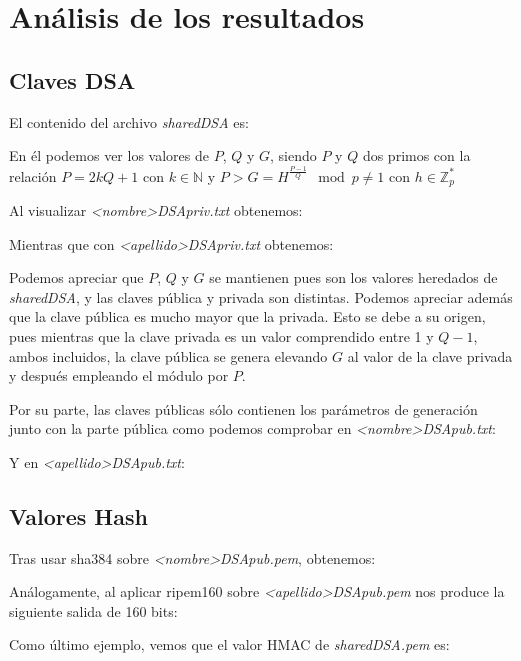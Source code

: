 \documentclass[a4paper, 11pt]{article}
\begin{document}
\section{Análisis de los resultados}
	\subsection{Claves DSA}
		El contenido del archivo \textit{sharedDSA} es:
		

		En él podemos ver los valores de $P$, $Q$ y $G$, siendo $P$ y $Q$ dos primos con la relación $P = 2kQ+1$ con $k \in
		\mathbb{N}$ y $P > G = H^{\frac{P-1}{Q}} \mod{p} \neq 1$ con $h \in \mathbb{Z}^*_p$
		
		Al visualizar \textit{<nombre>DSApriv.txt} obtenemos:
		
		
		Mientras que con \textit{<apellido>DSApriv.txt} obtenemos:
		
		
		Podemos apreciar que $P$, $Q$ y $G$ se mantienen pues son los valores heredados de \textit{sharedDSA}, y las claves
		pública y privada son distintas. Podemos apreciar además que la clave pública es mucho mayor que la privada. Esto se
		debe a su origen, pues mientras que la clave privada es un valor comprendido entre 1 y $Q-1$, ambos incluidos, la
		clave pública se genera elevando $G$ al valor de la clave privada y después empleando el módulo por $P$.

		Por su parte, las claves públicas sólo contienen los parámetros de generación junto con la parte pública como podemos
		comprobar en \textit{<nombre>DSApub.txt}:
		
		
		Y en \textit{<apellido>DSApub.txt}:
		
		
	\subsection{Valores Hash}
		Tras usar sha384 sobre \textit{<nombre>DSApub.pem}, obtenemos:
		
		
		Análogamente, al aplicar ripem160 sobre \textit{<apellido>DSApub.pem} nos produce la siguiente salida de 160 bits:
		
		
		Como último ejemplo, vemos que el valor HMAC de \textit{sharedDSA.pem} es:
		
\end{document}
